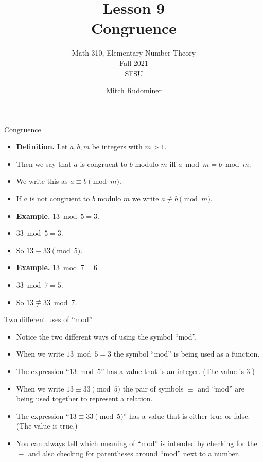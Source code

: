 \documentclass{beamer}
\title{Lesson 9 \\ Congruence}
\subtitle{Math 310, Elementary Number Theory \\ Fall 2021 \\ SFSU}
\author{Mitch Rudominer}
\date{}
\begin{document}
\begin{frame}
  \titlepage
\end{frame}

\begin{frame}{Congruence}

\begin{itemize}
  \item \textbf{Definition.} Let $a,b,m$ be integers with $m>1$.
  \item Then we say that $a$ is congruent to $b$ modulo $m$ iff $a\bmod m = b\bmod m$.
  \item We write this as $a\equiv b \pmod m$.
  \item If $a$ is not congruent to $b$ modulo $m$ we write $a\not\equiv b \pmod m$.
  \item \textbf{Example.} $13\bmod 5 = 3$.
  \item $33 \bmod 5 = 3$.
  \item So $13 \equiv 33 \pmod 5$.
  \item \textbf{Example.} $13 \bmod 7 = 6$
  \item $33 \bmod 7 = 5$.
  \item So $13 \not\equiv 33 \bmod 7$.
\end{itemize}

\end{frame}

\begin{frame}{Two different uses of ``mod''}

\begin{itemize}
  \item Notice the two different ways of using the symbol ``mod''.
  \item When we write $13\bmod 5 = 3$ the symbol ``mod'' is being used as a function.
  \item The expression ``$13\bmod 5$'' has a value that is an integer. (The value is 3.)
  \item When we write $13 \equiv 33 \pmod 5$ the pair of symbols $\equiv$ and ``mod'' are being
  used together to represent a relation.
  \item The expression ``$13 \equiv 33 \pmod 5$'' has a value that is either true or false. (The value is true.)
  \item You can always tell which meaning of ``mod'' is intended by checking for the $\equiv$ and
  also checking for parentheses around  ``mod'' next to a number.
\end{itemize}

\end{frame}
\end{document}
